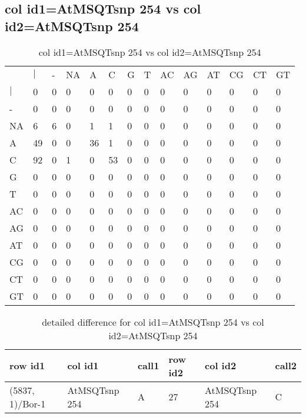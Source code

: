 \subsection{col id1=AtMSQTsnp 254 vs col id2=AtMSQTsnp 254}
\begin{center}
\begin{longtable}{|l|l|l|l|l|l|l|l|l|l|l|l|l|l|}
\caption{col id1=AtMSQTsnp 254 vs col id2=AtMSQTsnp 254} \label{table_dm610}\\
\hline
\\
\hline
&$|$&-&NA&A&C&G&T&AC&AG&AT&CG&CT&GT\\
$|$&0&0&0&0&0&0&0&0&0&0&0&0&0\\
-&0&0&0&0&0&0&0&0&0&0&0&0&0\\
NA&6&6&0&1&1&0&0&0&0&0&0&0&0\\
A&49&0&0&36&1&0&0&0&0&0&0&0&0\\
C&92&0&1&0&53&0&0&0&0&0&0&0&0\\
G&0&0&0&0&0&0&0&0&0&0&0&0&0\\
T&0&0&0&0&0&0&0&0&0&0&0&0&0\\
AC&0&0&0&0&0&0&0&0&0&0&0&0&0\\
AG&0&0&0&0&0&0&0&0&0&0&0&0&0\\
AT&0&0&0&0&0&0&0&0&0&0&0&0&0\\
CG&0&0&0&0&0&0&0&0&0&0&0&0&0\\
CT&0&0&0&0&0&0&0&0&0&0&0&0&0\\
GT&0&0&0&0&0&0&0&0&0&0&0&0&0\\
\hline
\end{longtable}
\end{center}

\begin{center}
\begin{longtable}{|l|l|l|l|l|l|}
\caption{detailed difference for col id1=AtMSQTsnp 254 vs col id2=AtMSQTsnp 254} \label{table_dm611}\\
\hline
row id1&col id1&call1&row id2&col id2&call2\\
\hline
(5837, 1)/Bor-1&AtMSQTsnp 254&A&27&AtMSQTsnp 254&C\\
\hline
\end{longtable}
\end{center}

